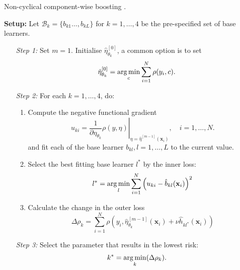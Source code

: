 \begin{algorithm}[!t]
	\caption{Non-cyclical component-wise boosting \autocite{thomasGradientBoostingDistributional2018}.}\label{alg:noncyclicalboosting}
	\textbf{Setup:} Let $\mathcal{B}_k = \lbrace b_{k1} \dots, b_{kL} \rbrace$ for $k = 1, \dots, 4$ be the pre-specified set of base learners.
	\begin{itemize}
		\item[\textit{Step 1:}] Set $m = 1$. Initialise $\hat{\eta}_{\theta_k}^{[0]}$, a common option is to set
		    \begin{equation*}
				\hat{\eta}_{\theta_k}^{[0]} = \operatorname*{arg\,min}_c \sum_{i = 1}^{N} \rho(y_i, c).
			\end{equation*}
		
		\item[\textit{Step 2:}] For each $k = 1, \dots, 4$, do:
		 \begin{enumerate}
			
			\item Compute the negative functional gradient 
			\begin{equation*}
				u_{ki} = \left. \frac{1}{\partial \eta_{\theta_k}} \rho(y, \eta) \right \rvert_{\eta = \hat{\eta}^{[m-1]} (\mathbf{x}_i)}, \quad i = 1, \dots, N.
			\end{equation*}
			and fit each of the base learner $b_{kl}, l = 1, \dots, L$ to the current value.
			
			\item Select the best fitting base learner $l^*$ by the inner loss: 
			\begin{equation*}
				l^* = \operatorname*{arg\,min}_{l} \sum^{N}_{i=1} \left(u_{ki} - \hat{b}_{kl} (\mathbf{x}_i) \right)^2
			\end{equation*}
			
			\item Calculate the change in the outer loss 
			\begin{equation*}
				\Delta \rho_k  = \sum^{N}_{i=1} \rho \left( y_i, \hat{\eta}_{\theta_k}^{[m-1]} (\mathbf{x}_i) + \nu \hat{h}_{kl^*} (\mathbf{x}_i)  \right)
			\end{equation*}
		\end{enumerate}
	
		\item[\textit{Step 3:}] Select the parameter that results in the lowest risk:
			\begin{equation*}
				k^* = \operatorname*{arg\,min}_k (\Delta \rho_k).
			\end{equation*}
			

\end{itemize}
\end{algorithm}
